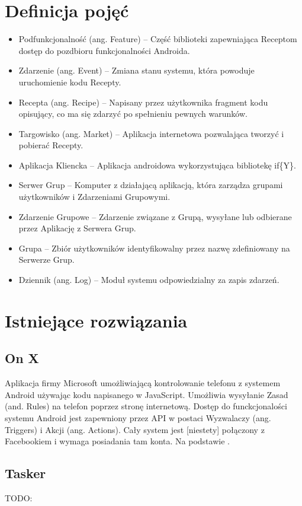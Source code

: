 \documentclass[11pt,a4paper,polish,thesis]{dcsbook}
\begin{document}
\section{Definicja pojęć}
\begin{itemize}
\item Podfunkcjonalność (ang. Feature) -- Część biblioteki zapewniająca Receptom dostęp do pozdbioru funkcjonalności Androida.
\item Zdarzenie (ang. Event) -- Zmiana stanu systemu, która powoduje uruchomienie kodu Recepty.
\item Recepta (ang. Recipe) -- Napisany przez użytkownika fragment kodu opisujący, co ma się zdarzyć po spełnieniu pewnych warunków.
\item Targowisko (ang. Market) -- Aplikacja internetowa pozwalająca tworzyć i pobierać Recepty.
\item Aplikacja Kliencka -- Aplikacja androidowa wykorzystująca bibliotekę if\{Y\}. 
\item Serwer Grup -- Komputer z działającą aplikacją, która zarządza grupami użytkowników i Zdarzeniami Grupowymi.
\item Zdarzenie Grupowe -- Zdarzenie związane z Grupą, wysyłane lub odbierane przez Aplikację z Serwera Grup.
\item Grupa -- Zbiór użytkowników identyfikowalny przez nazwę zdefiniowany na Serwerze Grup.
\item Dziennik (ang. Log) -- Moduł systemu odpowiedzialny za zapis zdarzeń.
\end{itemize}
\section{Istniejące rozwiązania} %
\subsection{On X}
Aplikacja firmy Microsoft umożliwiającą kontrolowanie telefonu z systemem Android używając kodu napisanego w JavaScript. Umożliwia wysyłanie Zasad (and. Rules) na
telefon poprzez stronę internetową. Dostęp do funckcjonalości systemu Android jest zapewniony przez API w postaci Wyzwalaczy (ang. Triggers) i Akcji (ang. Actions).
Cały system jest [niestety] połączony z Facebookiem i wymaga posiadania tam konta. Na podstawie \cite{onx}.
\subsection{Tasker}
TODO:
\end{document}
